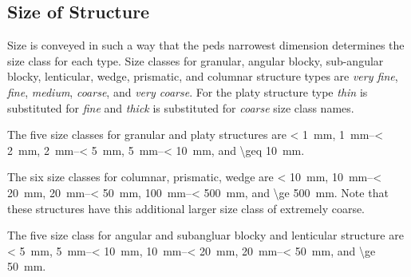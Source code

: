 \documentclass{article}
\begin{document}
\subsection{Size of Structure}
    
Size is conveyed in such a way that the peds narrowest dimension  determines the size class for each type. Size classes for granular, angular blocky, sub-angular blocky, lenticular, wedge, prismatic, and columnar structure types are \textit{very fine}, \textit{fine}, \textit{medium}, \textit{coarse}, and \textit{very coarse}. For the platy structure type \textit{thin} is substituted for \textit{fine} and \textit{thick} is substituted for \textit{coarse} size class names.

The five size classes for granular and platy structures are \qty{< 1}{\milli\meter}, \qtyrange{1}{< 2}{\milli\meter}, \qtyrange{2}{< 5}{\milli\meter}, \qtyrange{5}{< 10}{\milli\meter}, and \qty{\geq 10}{\milli\meter}.

The six size classes for columnar, prismatic, wedge are \qty{< 10}{mm}, \qtyrange{10}{< 20}{mm}, \qtyrange{20}{< 50}{mm}, \qtyrange{100}{< 500}{mm}, and \qty{\ge 500}{mm}. Note that these structures have this additional larger size class of extremely coarse.

The five size class for angular and subangluar blocky and lenticular structure are \qty{< 5}{mm}, \qtyrange{5}{< 10}{mm}, \qtyrange{10}{< 20}{mm}, \qtyrange{20}{< 50}{mm}, and \qty{\ge 50}{mm}.

\end{document}
